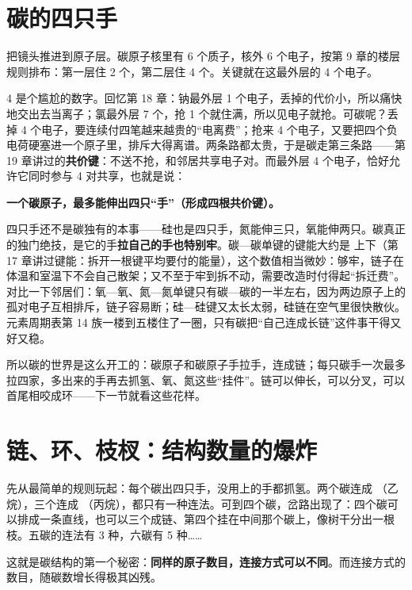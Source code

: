 \section{碳的四只手}

把镜头推进到原子层。碳原子核里有 6 个质子，核外 6 个电子，按第 9 章的楼层规则排布：第一层住 2 个，第二层住 4 个。关键就在这最外层的 4 个电子。

4 是个尴尬的数字。回忆第 18 章：钠最外层 1 个电子，丢掉的代价小，所以痛快地交出去当离子；氯最外层 7 个，抢 1 个就住满，所以见电子就抢。可碳呢？丢掉 4 个电子，要连续付四笔越来越贵的“电离费”；抢来 4 个电子，又要把四个负电荷硬塞进一个原子里，排斥大得离谱。两条路都太贵，于是碳走第三条路——第 19 章讲过的\textbf{共价键}：不送不抢，和邻居共享电子对。而最外层 4 个电子，恰好允许它同时参与 4 对共享，也就是说：

\textbf{一个碳原子，最多能伸出四只“手”（形成四根共价键）。}

四只手还不是碳独有的本事——硅也是四只手，氮能伸三只，氧能伸两只。碳真正的独门绝技，是它的手\textbf{拉自己的手也特别牢}。碳—碳单键的键能大约是  上下（第 17 章讲过键能：拆开一根键平均要付的能量），这个数值相当微妙：够牢，链子在体温和室温下不会自己散架；又不至于牢到拆不动，需要改造时付得起“拆迁费”。对比一下邻居们：氧—氧、氮—氮单键只有碳—碳的一半左右，因为两边原子上的孤对电子互相排斥，链子容易断；硅—硅键又太长太弱，硅链在空气里很快散伙。元素周期表第 14 族一楼到五楼住了一圈，只有碳把“自己连成长链”这件事干得又好又稳。

所以碳的世界是这么开工的：碳原子和碳原子手拉手，连成链；每只碳手一次最多拉四家，多出来的手再去抓氢、氧、氮这些“挂件”。链可以伸长，可以分叉，可以首尾相咬成环——下一节就看这些花样。

\section{链、环、枝杈：结构数量的爆炸}

先从最简单的规则玩起：每个碳出四只手，没用上的手都抓氢。两个碳连成 （乙烷），三个连成 （丙烷），都只有一种连法。可到四个碳，岔路出现了：四个碳可以排成一条直线，也可以三个成链、第四个挂在中间那个碳上，像树干分出一根枝。五碳的连法有 3 种，六碳有 5 种……

这就是碳结构的第一个秘密：\textbf{同样的原子数目，连接方式可以不同}。而连接方式的数目，随碳数增长得极其凶残。

